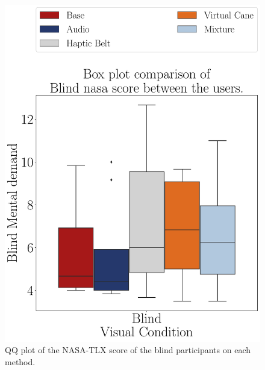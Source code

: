 \begin{figure}[!htb]
    \centering
    \begin{minipage}{0.45\textwidth}
        \centering
        \includegraphics[width = \textwidth]{Resultados/Nasa/Figuras/pdf/boxplot_nasa_blind_scene.pdf}
        \caption{QQ plot of the NASA-TLX score of the blind participants on each method.}
        \label{fig:boxplot_nasa_blind_scene}
    \end{minipage}
    \begin{minipage}{0.075\textwidth}
        \hfill
    \end{minipage}
    \begin{minipage}{0.45\textwidth}
        \centering

\end{minipage}
\end{figure}
